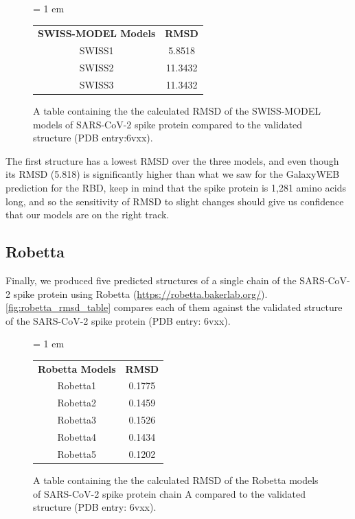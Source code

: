 \begin{figure}[h]
	\centering
	\tabcolsep = 1 em
	\mySfFamily
	\begin{tabular}{c c}
		\textbf{SWISS-MODEL Models} & \textbf{RMSD} \\
		SWISS1 & 5.8518 \\
		SWISS2 & 11.3432 \\
		SWISS3 & 11.3432 \\
	\end{tabular}
	\caption{A table containing the the calculated RMSD of the SWISS-MODEL models of SARS-CoV-2 spike protein compared to the validated structure (PDB entry:6vxx).}
	\label{fig:swiss_rmsd_table}
\end{figure}

The first structure has a lowest RMSD over the three models, and even though its RMSD (5.818) is significantly higher than what we saw for the GalaxyWEB prediction for the RBD, keep in mind that the spike protein is 1,281 amino acids long, and so the sensitivity of RMSD to slight changes should give us confidence that our models are on the right track.

\FloatBarrier
{}
\subsection{Robetta}

Finally, we produced five predicted structures of a single chain of the SARS-CoV-2 spike protein using Robetta (\url{https://robetta.bakerlab.org/}). \autoref{fig:robetta_rmsd_table} compares each of them against the validated structure of the SARS-CoV-2 spike protein (PDB entry: 6vxx).\\

\begin{figure}[h]
	\centering
	\tabcolsep = 1 em
	\mySfFamily
	\begin{tabular}{c c}
		\textbf{Robetta Models} & \textbf{RMSD} \\
		Robetta1 & 0.1775 \\
		Robetta2 & 0.1459 \\
		Robetta3 & 0.1526 \\
		Robetta4 & 0.1434 \\
		Robetta5 & 0.1202 \\
	\end{tabular}
	\caption{A table containing the the calculated RMSD of the Robetta models of SARS-CoV-2 spike protein chain A compared to the validated structure (PDB entry: 6vxx).}
	\label{fig:robetta_rmsd_table}
\end{figure}


